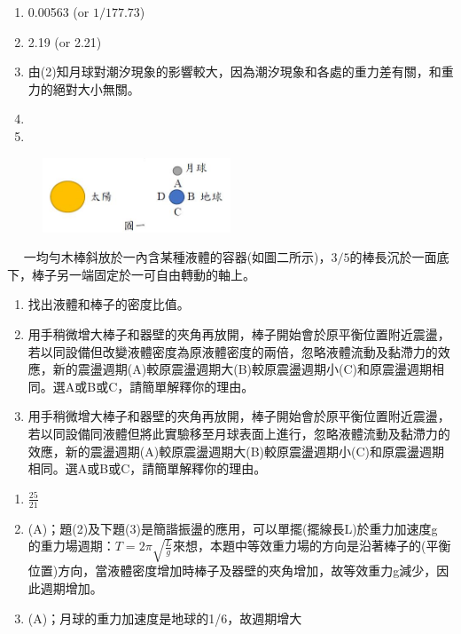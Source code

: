 \documentclass[cn,10pt,math=newtx,chinesefont=founder]{elegantbook}
\begin{document}
\begin{solution}
\begin{enumerate}[label=(\arabic*)]
\item 0.00563 (or $1/177.73$)
\item 2.19 (or 2.21)
\item 由(2)知月球對潮汐現象的影響較大，因為潮汐現象和各處的重力差有關，和重力的絕對大小無關。
\item 
\item 
\end{enumerate}
\end{solution}

\begin{figure}[htbp]
\flushright
\includegraphics[width=0.5\textwidth]{image/11.JPG}
\end{figure}

\newpage


\begin{example}　
    一均勻木棒斜放於一內含某種液體的容器(如圖二所示)，$3/5$的棒長沉於一面底下，棒子另一端固定於一可自由轉動的軸上。
    \begin{enumerate}[label=(\arabic*)]
    \item 找出液體和棒子的密度比值。
    \item 用手稍微增大棒子和器壁的夾角再放開，棒子開始會於原平衡位置附近震盪，若以同設備但改變液體密度為原液體密度的兩倍，忽略液體流動及黏滯力的效應，新的震盪週期(A)較原震盪週期大(B)較原震盪週期小(C)和原震盪週期相同。選A或B或C，請簡單解釋你的理由。
    \item 用手稍微增大棒子和器壁的夾角再放開，棒子開始會於原平衡位置附近震盪，若以同設備同液體但將此實驗移至月球表面上進行，忽略液體流動及黏滯力的效應，新的震盪週期(A)較原震盪週期大(B)較原震盪週期小(C)和原震盪週期相同。選A或B或C，請簡單解釋你的理由。
    \end{enumerate}
    
    \rightline{[2]}
\end{example}

\begin{solution}
\begin{enumerate}[label=(\arabic*)]
\item $\frac{25}{21}$
\item (A)；題(2)及下題(3)是簡諧振盪的應用，可以單擺(擺線長L)於重力加速度g 的重力場週期：$T=2\pi \sqrt{\frac{L}{g}}$來想，本題中等效重力場的方向是沿著棒子的(平衡位置)方向，當液體密度增加時棒子及器壁的夾角增加，故等效重力g減少，因此週期增加。
\item (A)；月球的重力加速度是地球的1/6，故週期增大
\end{enumerate}
\end{solution}
\end{document}
